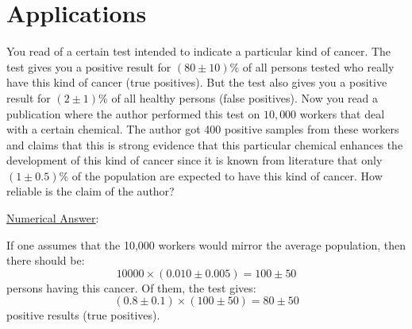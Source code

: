 \begin{itemize}
\end{itemize}

\newpage
\section{Applications}
You read of a certain test intended to indicate a particular kind of cancer. The test gives you a positive result for $(80 \pm 10) \%$ of all persons tested who really have this kind of cancer (true positives). But the test also gives you a positive result for $(2 \pm 1) \%$ of all healthy persons (false positives). Now you read a publication where the author performed this test on $10,000$ workers that deal with a certain chemical. The author got 400 positive samples from these workers and claims that this is strong evidence that this particular chemical enhances the development of this kind of cancer since it is known from literature that only $(1 \pm 0.5)\%$ of the population are expected to have this kind of cancer. How reliable is the claim of the author?\myskip

\noindent \underline{Numerical Answer}:

If one assumes that the 10,000 workers would mirror the average population, then there should be:
\begin{equation}
    10000 \times (0.010 \pm 0.005) = 100 \pm 50
\end{equation}
persons having this cancer. Of them, the test gives:
\begin{equation}
    (0.8 \pm 0.1) \times (100 \pm 50) = 80 \pm 50
\end{equation}
positive results (true positives).\myskip

